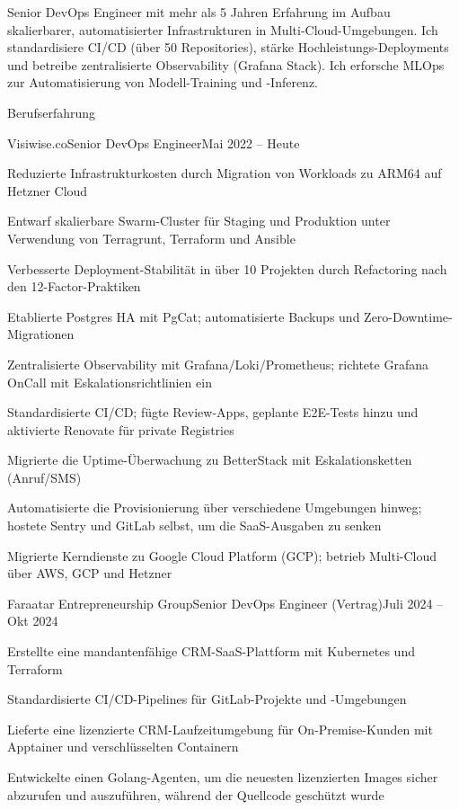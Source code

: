 \documentclass[]{main}
\begin{document}
\resumeheader
{\address{Leipzig, Deutschland}}
{}
{}
{}
{}
{}

Senior DevOps Engineer mit mehr als 5 Jahren Erfahrung im Aufbau skalierbarer, automatisierter Infrastrukturen in Multi-Cloud-Umgebungen. Ich standardisiere CI/CD (über 50 Repositories), stärke Hochleistungs-Deployments und betreibe zentralisierte Observability (Grafana Stack). Ich erforsche MLOps zur Automatisierung von Modell-Training und -Inferenz.

\begin{section}{Berufserfahrung}
 \begin{subsection}{Visiwise.co}{Senior DevOps Engineer}{Mai 2022 -- Heute}{}
     \item Reduzierte Infrastrukturkosten durch Migration von Workloads zu ARM64 auf Hetzner Cloud
     \item Entwarf skalierbare Swarm-Cluster für Staging und Produktion unter Verwendung von Terragrunt, Terraform und Ansible
     \item Verbesserte Deployment-Stabilität in über 10 Projekten durch Refactoring nach den 12-Factor-Praktiken
     \item Etablierte Postgres HA mit PgCat; automatisierte Backups und Zero-Downtime-Migrationen
     \item Zentralisierte Observability mit Grafana/Loki/Prometheus; richtete Grafana OnCall mit Eskalationsrichtlinien ein
     \item Standardisierte CI/CD; fügte Review-Apps, geplante E2E-Tests hinzu und aktivierte Renovate für private Registries
     \item Migrierte die Uptime-Überwachung zu BetterStack mit Eskalationsketten (Anruf/SMS)
     \item Automatisierte die Provisionierung über verschiedene Umgebungen hinweg; hostete Sentry und GitLab selbst, um die SaaS-Ausgaben zu senken
     \item Migrierte Kerndienste zu Google Cloud Platform (GCP); betrieb Multi-Cloud über AWS, GCP und Hetzner
 \end{subsection}

 \begin{subsection}{Faraatar Entrepreneurship Group}{Senior DevOps Engineer (Vertrag)}{Juli 2024 -- Okt 2024}{}
     \item Erstellte eine mandantenfähige CRM-SaaS-Plattform mit Kubernetes und Terraform
     \item Standardisierte CI/CD-Pipelines für GitLab-Projekte und -Umgebungen
     \item Lieferte eine lizenzierte CRM-Laufzeitumgebung für On-Premise-Kunden mit Apptainer und verschlüsselten Containern
     \item Entwickelte einen Golang-Agenten, um die neuesten lizenzierten Images sicher abzurufen und auszuführen, während der Quellcode geschützt wurde
 \end{subsection}


\end{section}
\end{document}
